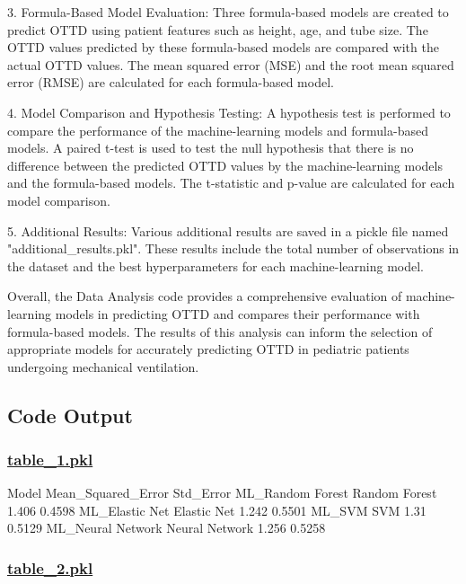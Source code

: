 \documentclass[11pt]{article}
\begin{document}
3. Formula-Based Model Evaluation: Three formula-based models are created to predict OTTD using patient features such as height, age, and tube size. The OTTD values predicted by these formula-based models are compared with the actual OTTD values. The mean squared error (MSE) and the root mean squared error (RMSE) are calculated for each formula-based model.

4. Model Comparison and Hypothesis Testing: A hypothesis test is performed to compare the performance of the machine-learning models and formula-based models. A paired t-test is used to test the null hypothesis that there is no difference between the predicted OTTD values by the machine-learning models and the formula-based models. The t-statistic and p-value are calculated for each model comparison.

5. Additional Results: Various additional results are saved in a pickle file named "additional\_results.pkl". These results include the total number of observations in the dataset and the best hyperparameters for each machine-learning model.

Overall, the Data Analysis code provides a comprehensive evaluation of machine-learning models in predicting OTTD and compares their performance with formula-based models. The results of this analysis can inform the selection of appropriate models for accurately predicting OTTD in pediatric patients undergoing mechanical ventilation.

\subsection{Code Output}\hypertarget{file-table-1-pkl}{}

\subsubsection*{\hyperlink{code-Data Analysis-table-1-pkl}{table\_1.pkl}}

\begin{codeoutput}
                            Model  Mean\_Squared\_Error  Std\_Error
ML\_Random Forest    Random Forest               1.406     0.4598
ML\_Elastic Net        Elastic Net               1.242     0.5501
ML\_SVM                        SVM                1.31     0.5129
ML\_Neural Network  Neural Network               1.256     0.5258
\end{codeoutput}\hypertarget{file-table-2-pkl}{}

\subsubsection*{\hyperlink{code-Data Analysis-table-2-pkl}{table\_2.pkl}}
\end{document}
